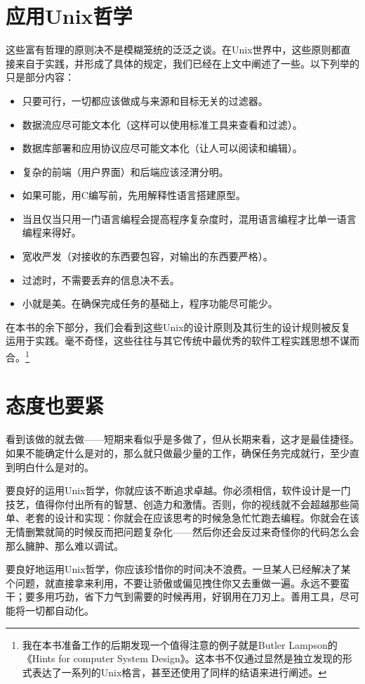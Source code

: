 \documentclass[12pt,oneside]{book}
\begin{document}
\section{应用Unix哲学}
这些富有哲理的原则决不是模糊笼统的泛泛之谈。在Unix世界中，这些原则都直接来自于实践，并形成了具体的规定，我们已经在上文中阐述了一些。以下列举的只是部分内容：
\begin{itemize}
\item 只要可行，一切都应该做成与来源和目标无关的过滤器。
\item 数据流应尽可能文本化（这样可以使用标准工具来查看和过滤）。
\item 数据库部署和应用协议应尽可能文本化（让人可以阅读和编辑）。
\item 复杂的前端（用户界面）和后端应该泾渭分明。
\item 如果可能，用C编写前，先用解释性语言搭建原型。
\item 当且仅当只用一门语言编程会提高程序复杂度时，混用语言编程才比单一语言编程来得好。
\item 宽收严发（对接收的东西要包容，对输出的东西要严格）。
\item 过滤时，不需要丢弃的信息决不丢。
\item 小就是美。在确保完成任务的基础上，程序功能尽可能少。
\end{itemize}

在本书的余下部分，我们会看到这些Unix的设计原则及其衍生的设计规则被反复运用于实践。毫不奇怪，这些往往与其它传统中最优秀的软件工程实践思想不谋而合。\footnote{我在本书准备工作的后期发现一个值得注意的例子就是Butler Lampson的《Hints for computer System Design》\cite{Lampson}。这本书不仅通过显然是独立发现的形式表达了一系列的Unix格言，甚至还使用了同样的结语来进行阐述。}

\section{态度也要紧}
看到该做的就去做——短期来看似乎是多做了，但从长期来看，这才是最佳捷径。如果不能确定什么是对的，那么就只做最少量的工作，确保任务完成就行，至少直到明白什么是对的。

要良好的运用Unix哲学，你就应该不断追求卓越。你必须相信，软件设计是一门技艺，值得你付出所有的智慧、创造力和激情。否则，你的视线就不会超越那些简单、老套的设计和实现：你就会在应该思考的时候急急忙忙跑去编程。你就会在该无情删繁就简的时候反而把问题复杂化——然后你还会反过来奇怪你的代码怎么会那么臃肿、那么难以调试。

要良好地运用Unix哲学，你应该珍惜你的时间决不浪费。一旦某人已经解决了某个问题，就直接拿来利用，不要让骄傲或偏见拽住你又去重做一遍。永远不要蛮干；要多用巧劲，省下力气到需要的时候再用，好钢用在刀刃上。善用工具，尽可能将一切都自动化。
\end{document}

